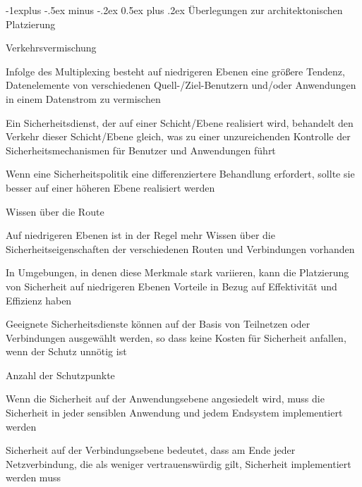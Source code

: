\documentclass[a4paper]{article}
\makeatletter
\renewcommand{\subsection}{\@startsection{subsection}{2}{0mm}%
 {-1explus -.5ex minus -.2ex}%
 {0.5ex plus .2ex}%
 {\normalfont\normalsize\bfseries}}
\makeatother
\begin{document}
\begin{multicols}{3}
      \subsection{Überlegungen zur architektonischen Platzierung}
      \begin{itemize*}
            \item Verkehrsvermischung
            \begin{itemize*}
                  \item Infolge des Multiplexing besteht auf niedrigeren Ebenen eine größere Tendenz, Datenelemente von verschiedenen Quell-/Ziel-Benutzern und/oder Anwendungen in einem Datenstrom zu vermischen
                  \item Ein Sicherheitsdienst, der auf einer Schicht/Ebene realisiert wird, behandelt den Verkehr dieser Schicht/Ebene gleich, was zu einer unzureichenden Kontrolle der Sicherheitsmechanismen für Benutzer und Anwendungen führt
                  \item Wenn eine Sicherheitspolitik eine differenziertere Behandlung erfordert, sollte sie besser auf einer höheren Ebene realisiert werden
            \end{itemize*}
            \item Wissen über die Route
            \begin{itemize*}
                  \item Auf niedrigeren Ebenen ist in der Regel mehr Wissen über die Sicherheitseigenschaften der verschiedenen Routen und Verbindungen vorhanden
                  \item In Umgebungen, in denen diese Merkmale stark variieren, kann die Platzierung von Sicherheit auf niedrigeren Ebenen Vorteile in Bezug auf Effektivität und Effizienz haben
                  \item Geeignete Sicherheitsdienste können auf der Basis von Teilnetzen oder Verbindungen ausgewählt werden, so dass keine Kosten für Sicherheit anfallen, wenn der Schutz unnötig ist
            \end{itemize*}
            \item Anzahl der Schutzpunkte
            \begin{itemize*}
                  \item Wenn die Sicherheit auf der Anwendungsebene angesiedelt wird, muss die Sicherheit in jeder sensiblen Anwendung und jedem Endsystem implementiert werden
                  \item Sicherheit auf der Verbindungsebene bedeutet, dass am Ende jeder Netzverbindung, die als weniger vertrauenswürdig gilt, Sicherheit implementiert werden muss

\end{itemize*}
\end{itemize*}
\end{multicols}
\end{document}
